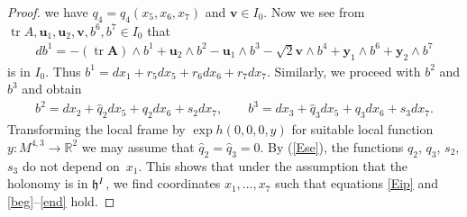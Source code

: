 \documentclass[pdftex]{sigma}
\numberwithin{equation}{section}
\newcommand\fh{{\frak h}}
\newcommand\bA{{\mathbf A}}
\newcommand\bu{{\mathbf u}}
\newcommand\by{{\mathbf y}}
\newcommand\bv{{\mathbf v}}
\newcommand\RR{{\mathbb R}}
\newcommand{\tr}{\operatorname{tr}}
\begin{document}
\begin{proof}
we have $q_4=q_4(x_5,x_6,x_7)$ and $\bv\in I_0$. Now we see from $\tr A, \bu_1, \bu_2, \bv, b^6, b^7 \in I_0$ that
\begin{gather*}db^1=-(\tr \bA)\wedge b^1 +\bu_2\wedge b^2-\bu_1\wedge b^3-\sqrt 2 \bv\wedge b^4+\by_1\wedge b^6 +\by_2\wedge b^7\end{gather*}
is in $I_0$. Thus $b^1=dx_1+ r_5 dx_5+ r_6 dx_6+r_7dx_7$. Similarly, we proceed with $b^2$ and $b^3$ and obtain
\begin{gather*}b^2=dx_2+\hat q_2dx_5+q_2 dx_6+s_2dx_7, \qquad b^3=dx_3+\hat q_3 dx_5 +q_3 dx_6+s_3dx_7.\end{gather*}
Transforming the local frame by $\exp h(0,0,0,y)$ for suitable local function $y\colon M^{4,3}\to \RR^2$ we may assume that $\hat q_{2}=\hat q_{3}=0$. By (\ref{Ese}), the functions $q_2$, $q_3$, $s_2$, $s_3$ do not depend on~$x_1$. This shows that under the assumption that the holonomy is in $\fh^I$, we find coordinates $x_1,\dots,x_7$ such that equations \eqref{Eip} and \eqref{beg}--\eqref{end} hold.


\end{proof}
\end{document}

